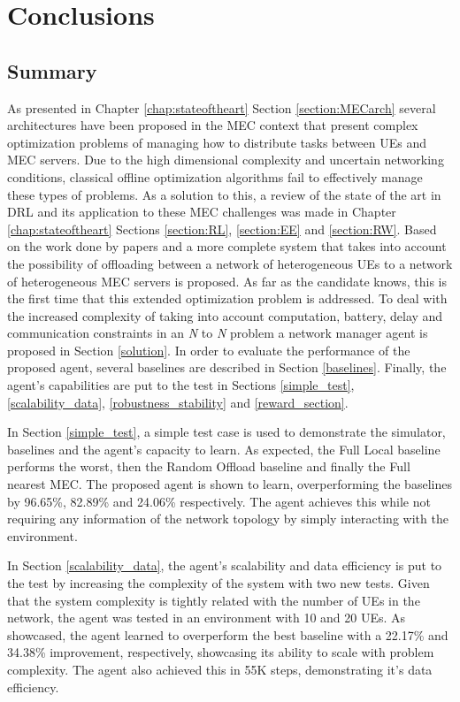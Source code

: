 \chapter{Conclusions}
\section{Summary}
\noindent As presented in Chapter \ref{chap:stateoftheart} Section \ref{section:MECarch} several architectures have been proposed in the \acrshort{MEC} context that present complex optimization problems of managing how to distribute tasks between \acrshort{UE}s and \acrshort{MEC} servers. Due to the high dimensional complexity and uncertain networking conditions, classical offline optimization algorithms fail to effectively manage these types of problems. As a solution to this, a review of the state of the art in \acrshort{DRL} and its application to these \acrshort{MEC} challenges was made in Chapter \ref{chap:stateoftheart} Sections \ref{section:RL}, \ref{section:EE} and \ref{section:RW}. Based on the work done by papers \cite{taskclass1} and \cite{NUE1mec} a more complete system that takes into account the possibility of offloading between a network of heterogeneous \acrshort{UE}s to a network of heterogeneous \acrshort{MEC} servers is proposed. As far as the candidate knows, this is the first time that this extended optimization problem is addressed. To deal with the increased complexity of taking into account computation, battery, delay and communication constraints in an \emph{N} to \emph{N} problem a network manager agent is proposed in Section \ref{solution}. In order to evaluate the performance of the proposed agent, several baselines are described in Section \ref{baselines}. Finally, the agent's capabilities are put to the test in Sections \ref{simple_test}, \ref{scalability_data}, \ref{robustness_stability} and \ref{reward_section}.

In Section \ref{simple_test}, a simple test case is used to demonstrate the simulator, baselines and the agent's capacity to learn. As expected, the Full Local baseline performs the worst, then the Random Offload baseline and finally the Full nearest MEC. The proposed agent is shown to learn, overperforming the baselines by 96.65\%, 82.89\% and 24.06\% respectively. The agent achieves this while not requiring any information of the network topology by simply interacting with the environment.

In Section \ref{scalability_data}, the agent's scalability and data efficiency is put to the test by increasing the complexity of the system with two new tests. Given that the system complexity is tightly related with the number of \acrshort{UE}s in the network, the agent was tested in an environment with 10 and 20 \acrshort{UE}s. As showcased, the agent learned to overperform the best baseline with a 22.17\% and 34.38\% improvement, respectively, showcasing its ability to scale with problem complexity. The agent also achieved this in 55K steps, demonstrating it's data efficiency.


